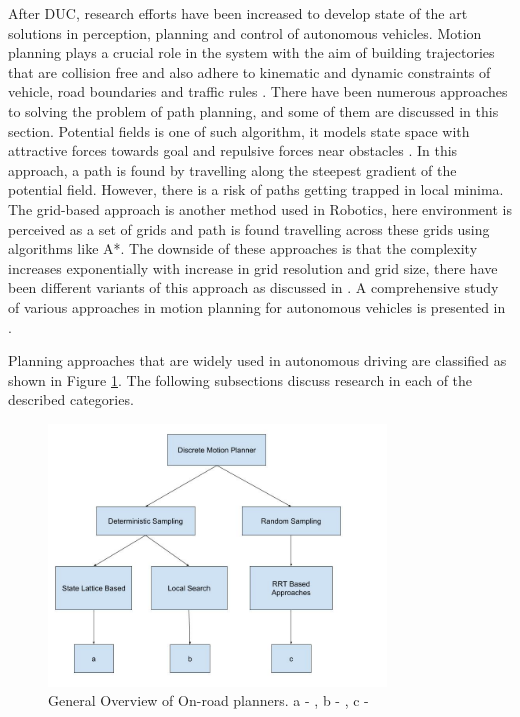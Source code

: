After DUC, research efforts have been increased to develop state of the art solutions in perception, planning and control of autonomous vehicles. Motion planning plays a crucial role in the system with the aim of building trajectories that are collision free and also adhere to kinematic and dynamic constraints of vehicle, road boundaries and traffic rules \cite{motion_planning_techniques}. There have been numerous approaches to solving the problem of path planning, and some of them are discussed in this section. Potential fields is one of such algorithm, it models state space with attractive forces towards goal and repulsive forces near obstacles \cite{potential_field_3} \cite{potential_field_1} \cite{potential_field_2}. In this approach, a path is found by travelling along the steepest gradient of the potential field. However, there is a risk of paths getting trapped in local minima. The grid-based approach is another method used in Robotics, here environment is perceived as a set of grids and path is found travelling across these grids using algorithms like A*. The downside of these approaches is that the complexity increases exponentially with increase in grid resolution and grid size, there have been different variants of this approach as discussed in \cite{A_star} \cite{D_star_1} \cite{kolski_thesis}. A comprehensive study of various approaches in motion planning for autonomous vehicles is presented in \cite{motion_planning_techniques} \cite{survey_planning_techniques}.

Planning approaches that are widely used in autonomous driving are classified as shown in Figure \ref{related_work_classification}. The following subsections discuss research in each of the described categories. 

\begin{figure}
	\centering
	\includegraphics[width=0.8\textwidth]{Images/related_work/planning_division.jpg}
	\caption{General Overview of On-road planners. a - \cite{cmu_parallel_thesis}  \cite{diss_shui_phd_thesis} \cite{traj_planner_optimization} \cite{lattice_Gu_Tiyanu} \cite{unit_A_star} , b - \cite{kolski_thesis} \cite{real_time_traj_plan_article} \cite{darpa_urban_challenge}, c -\cite{rrt_star} \cite{rrt_urban_driv} \cite{mit_rrt1}
	}
	\label{related_work_classification}
\end{figure}

